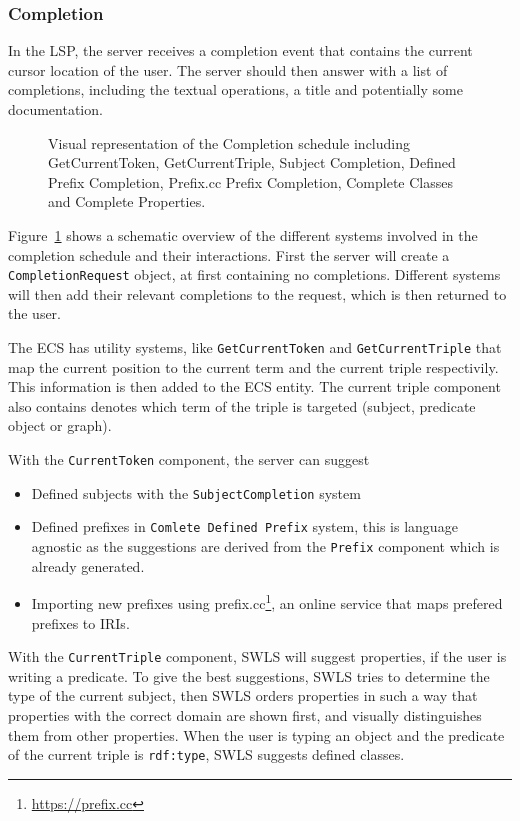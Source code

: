 \subsubsection{Completion}

In the LSP, the server receives a completion event that contains the current cursor location of the user.
The server should then answer with a list of completions, including the textual operations, a title and potentially some documentation.

\begin{figure}[!ht]
 \centering
  \caption{Visual representation of the Completion schedule including GetCurrentToken, GetCurrentTriple, Subject Completion, Defined Prefix Completion, Prefix.cc Prefix Completion, Complete Classes and Complete Properties.}\label{fig:Completion}
\end{figure}

Figure~\ref{fig:Completion} shows a schematic overview of the different systems involved in the completion schedule and their interactions.
First the server will create a \texttt{CompletionRequest} object, at first containing no completions.
Different systems will then add their relevant completions to the request, which is then returned to the user.

The ECS has utility systems, like \texttt{GetCurrentToken} and \texttt{GetCurrentTriple} that map the current position to the current term and the current triple respectivily. This information is then added to the ECS entity. The current triple component also contains denotes which term of the triple is targeted (subject, predicate object or graph).

With the \texttt{CurrentToken} component, the server can suggest
\begin{itemize}
  \item Defined subjects with the \texttt{SubjectCompletion} system
  \item Defined prefixes in \texttt{Comlete Defined Prefix} system, this is language agnostic as the suggestions are derived from the \texttt{Prefix} component which is already generated.
  \item Importing new prefixes using prefix.cc\footnote{\url{https://prefix.cc}}, an online service that maps prefered prefixes to IRIs.
\end{itemize}

With the \texttt{CurrentTriple} component, SWLS will suggest properties, if the user is writing a predicate.
To give the best suggestions, SWLS tries to determine the type of the current subject, then SWLS orders properties in such a way that properties with the correct domain are shown first,
and visually distinguishes them from other properties.
When the user is typing an object and the predicate of the current triple is \texttt{rdf:type}, SWLS suggests defined classes.


